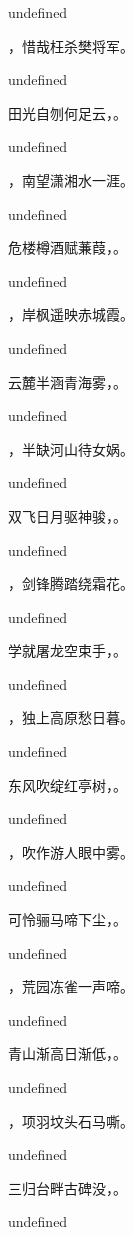 \documentclass[12pt, a4paper, addpoints]{exam}
\begin{document}
\begin{questions}
undefined

\question[3] \fillin，惜哉枉杀樊将军。

undefined

\question[3] 田光自刎何足云，\fillin。

undefined

\question[3] \fillin，南望潇湘水一涯。

undefined

\question[3] 危楼樽酒赋蒹葭，\fillin。

undefined

\question[3] \fillin，岸枫遥映赤城霞。

undefined

\question[3] 云麓半涵青海雾，\fillin。

undefined

\question[3] \fillin，半缺河山待女娲。

undefined

\question[3] 双飞日月驱神骏，\fillin。

undefined

\question[3] \fillin，剑锋腾踏绕霜花。

undefined

\question[3] 学就屠龙空束手，\fillin。

undefined

\question[3] \fillin，独上高原愁日暮。

undefined

\question[3] 东风吹绽红亭树，\fillin。

undefined

\question[3] \fillin，吹作游人眼中雾。

undefined

\question[3] 可怜骊马啼下尘，\fillin。

undefined

\question[3] \fillin，荒园冻雀一声啼。

undefined

\question[3] 青山渐高日渐低，\fillin。

undefined

\question[3] \fillin，项羽坟头石马嘶。

undefined

\question[3] 三归台畔古碑没，\fillin。

undefined
\end{questions}

\hspace{5cm}
\end{document}
